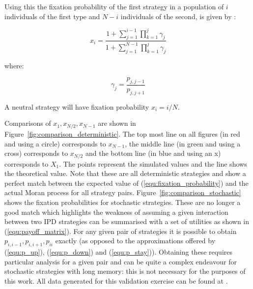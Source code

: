 \documentclass[10pt,journal]{IEEEtran}
\begin{document}
Using this the fixation probability
of the first strategy in a population of \(i\) individuals of the first type
and \(N-i\) individuals of the second, is given by \cite{Nowak2017}:

\begin{equation}\label{equ:fixation_probability}
x_i = \frac{1 + \sum_{j=1}^{i-1}\prod_{k=1}^{j}\gamma_j}{1 + \sum_{j=1}^{N-1}
      \prod_{k=1}^{j}\gamma_j}
\end{equation}

where:

\[
\gamma_j = \frac{p_{j, j-1}}{p_{j, j+1}}
\]

A neutral strategy will have fixation probability $x_i = i/N$.

Comparisons of \(x_1, x_{N/2}, x_{N-1}\) are shown in
Figure~\ref{fig:comparison_deterministic}. 
The top most line on all figures (in red and using a circle) corresponds to
\(x_{N-1}\), the middle line (in green and using a cross) corresponds to
\(x_{N/2}\) and the bottom line (in blue and using an x) corresponds to
\(X_{1}\).
The points represent the simulated
values and the line shows the theoretical value. Note that these are all
deterministic strategies and show a perfect match between the expected value
of (\ref{equ:fixation_probability}) and the actual Moran process for all
strategy pairs. Figure~\ref{fig:comparison_stochastic} shows the fixation probabilities for
stochastic strategies. These are no longer a good match which highlights the
weakness of assuming a given interaction between two IPD strategies can be
summarised with a set of utilities as shown in
(\ref{equ:payoff_matrix}). For any given pair of strategies it is possible to
obtain \(p_{i,i-1}, p_{i,i+1}, p_{ii}\) exactly (as opposed to the
approximations offered by (\ref{equ:p_up}), (\ref{equ:p_down}) and
(\ref{equ:p_stay})). Obtaining these requires particular analysis for a given
pair and can be quite a complex endeavour for stochastic strategies with long
memory: this is not necessary for the purposes of this work.
All data generated for this validation exercise can be found
at \cite{data}.
\end{document}
